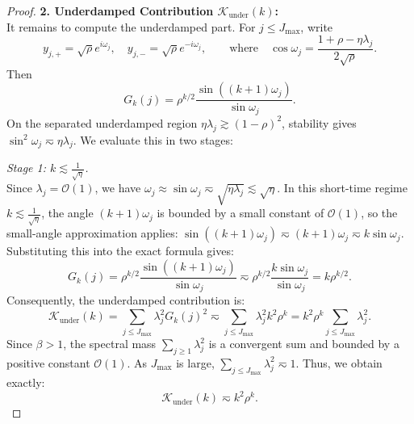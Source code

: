 \begin{proof}
\textbf{2. Underdamped Contribution $\mathcal{K}_{\mathrm{under}}(k)$:} \\
It remains to compute the underdamped part. For $j \le J_{\max}$, write
\[
    y_{j,+}=\sqrt \rho e^{i\omega_j},
    \quad
    y_{j,-}=\sqrt \rho e^{-i\omega_j},
    \qquad \text{where} \quad
    \cos \omega_j=\frac{1+\rho-\eta\lambda_j}{2\sqrt \rho}.
\]
Then
\begin{equation*}
    G_k(j)=\rho^{k/2}\frac{\sin((k+1)\omega_j)}{\sin \omega_j}.
\end{equation*}
On the separated underdamped region $\eta\lambda_j\gtrsim(1-\rho)^2$, stability gives $\sin^2\omega_j \eqsim \eta\lambda_j$. We evaluate this in two stages:

\textit{Stage 1: $k \lesssim \frac{1}{\sqrt{\eta}}$.} \\
Since $\lambda_j = \mathcal{O}(1)$, we have $\omega_j \approx \sin\omega_j \eqsim \sqrt{\eta\lambda_j} \lesssim \sqrt{\eta}$. In this short-time regime $k \lesssim \frac{1}{\sqrt{\eta}}$, the angle $(k+1)\omega_j$ is bounded by a small constant of $\mathcal{O}(1)$, so the small-angle approximation applies: $\sin((k+1)\omega_j) \eqsim (k+1)\omega_j \eqsim k\sin\omega_j$.
Substituting this into the exact formula gives:
\[
    G_k(j) = \rho^{k/2}\frac{\sin((k+1)\omega_j)}{\sin \omega_j} \eqsim \rho^{k/2} \frac{k \sin\omega_j}{\sin\omega_j} = k \rho^{k/2}.
\]
Consequently, the underdamped contribution is:
\[
    \mathcal K_{\mathrm{under}}(k) = \sum_{j \le J_{\max}} \lambda_j^2 G_k(j)^2 \eqsim \sum_{j \le J_{\max}} \lambda_j^2 k^2 \rho^k = k^2 \rho^k \sum_{j \le J_{\max}} \lambda_j^2.
\]
Since $\beta > 1$, the spectral mass $\sum_{j \ge 1} \lambda_j^2$ is a convergent sum and bounded by a positive constant $\mathcal{O}(1)$. As $J_{\max}$ is large, $\sum_{j \le J_{\max}} \lambda_j^2 \eqsim 1$. Thus, we obtain exactly:
\[
    \mathcal K_{\mathrm{under}}(k) \eqsim k^2 \rho^k.
\]


\end{proof}
